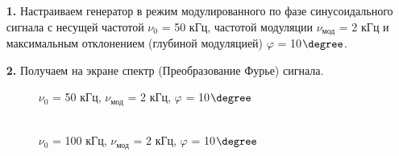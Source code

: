 \documentclass[a4paper,12pt]{article}
\theoremstyle{definition}
\begin{document}
\begin{enumerate}


\item [\textbf{1.}] Настраиваем генератор в режим модулированного по фазе синусоидального сигнала с несущей частотой $\nu_0$ = 50 кГц, частотой модуляции $\nu_\text{мод}$ = 2 кГц и максимальным отклонением (глубиной модуляцией) $\varphi$ = 10$\degree$.

\item [\textbf{2.}] Получаем на экране спектр (Преобразование Фурье) сигнала.

\begin{figure}[h]
\begin{minipage}[h]{0.44\linewidth}
 $\nu_0$ = 50 кГц, $\nu_\text{мод}$ = 2 кГц, $\varphi$ = 10$\degree$  \\
\end{minipage}
\hfill
\begin{minipage}[h]{0.44\linewidth}
 \\  $\nu_0$ = 100 кГц, $\nu_\text{мод}$ = 2 кГц, $\varphi$ = 10$\degree$   

\end{minipage}
\end{figure}
\end{enumerate}
\end{document}
